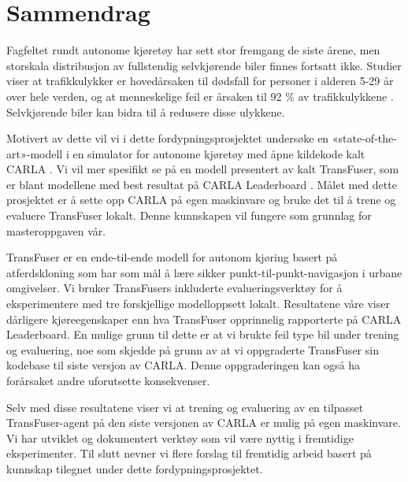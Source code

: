 \chapter*{Sammendrag}


Fagfeltet rundt autonome kjøretøy har sett stor fremgang de siste årene, men storskala distribusjon av fullstendig selvkjørende biler finnes fortsatt ikke. Studier viser at trafikkulykker er hovedårsaken til dødsfall for personer i alderen 5-29 år over hele verden, og at menneskelige feil er årsaken til 92 \% av trafikkulykkene \cite{WHO-road-safety-report, towards-connected-autonomous-driving}. Selvkjørende biler kan bidra til å redusere disse ulykkene.

Motivert av dette vil vi i dette fordypningsprosjektet undersøke en «state-of-the-art»-modell i en simulator for autonome kjøretøy med åpne kildekode kalt CARLA \cite{introducing-carla-paper}. Vi vil mer spesifikt se på en modell presentert av \textcite{transfuser-pami} kalt TransFuser, som er blant modellene med best resultat på CARLA Leaderboard \cite{carla-leaderboard}. Målet med dette prosjektet er å sette opp CARLA på egen maskinvare og bruke det til å trene og evaluere TransFuser lokalt. Denne kunnskapen vil fungere som grunnlag for masteroppgaven vår.

TransFuser er en ende-til-ende modell for autonom kjøring basert på atferdskloning som har som mål å lære sikker punkt-til-punkt-navigasjon i urbane omgivelser. Vi bruker TransFusers inkluderte evalueringsverktøy for å eksperimentere med tre forskjellige modelloppsett lokalt. Resultatene våre viser dårligere kjøreegenskaper enn hva TransFuser opprinnelig rapporterte på CARLA Leaderboard. En mulige grunn til dette er at vi brukte feil type bil under trening og evaluering, noe som skjedde på grunn av at vi oppgraderte TransFuser sin kodebase til siste versjon av CARLA. Denne oppgraderingen kan også ha forårsaket andre uforutsette konsekvenser.

Selv med disse resultatene viser vi at trening og evaluering av en tilpasset TransFuser-agent på den siste versjonen av CARLA er mulig på egen maskinvare. Vi har utviklet og dokumentert verktøy som vil være nyttig i fremtidige eksperimenter. Til slutt nevner vi flere forslag til fremtidig arbeid basert på kunnskap tilegnet under dette fordypningsprosjektet.  

